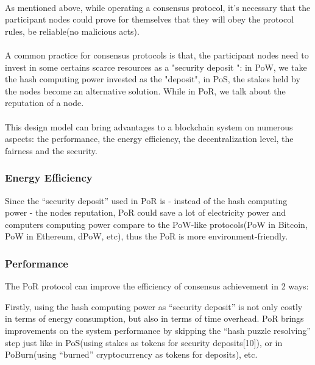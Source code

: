 \documentclass[]{article}
\begin{document}
\begin{CJK*}{UTF8}{gbsn}
\paragraph{} As mentioned above, while operating a consensus protocol, it's necessary that the participant nodes could prove for themselves that they will obey the protocol rules, be reliable(no malicious acts).
\paragraph{}
A common practice for consensus protocols is that, the participant nodes need to invest in some certains scarce resources as a "security deposit
": in PoW, we take the hash computing power invested as the "deposit", in PoS, the stakes held by the nodes become an alternative solution. While in PoR, we talk about the reputation of a node.
\paragraph{}
This design model can bring advantages to a blockchain system on numerous aspects: the performance, the energy efficiency, the decentralization level, the fairness and the security.
\subsubsection*{Energy Efficiency}
Since the ``security deposit'' used in PoR is - instead of the hash computing power - the nodes reputation, PoR could save a lot of electricity power and computers computing power compare to the PoW-like protocols(PoW in Bitcoin, PoW in Ethereum, dPoW, etc), thus the PoR is more environment-friendly.  
\subsubsection*{Performance}
The PoR protocol can improve the efficiency of consensus achievement in 2 ways:
\par Firstly, using the hash computing power as ``security deposit'' is not only costly in terms of energy consumption, but also in terms of time overhead. PoR brings improvements on the system performance by skipping the ``hash puzzle resolving'' step just like in PoS(using stakes as tokens for security deposits[10]), or in PoBurn(using ``burned'' cryptocurrency as tokens for deposits), etc.

\end{CJK*}
\end{document}
